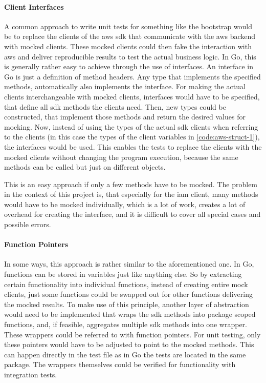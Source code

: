 \paragraph{Client Interfaces} A common approach to write unit tests for something like the bootstrap would be to replace the clients of the \ac{aws} \ac{sdk} that communicate with the \ac{aws} backend with mocked clients.
These mocked clients could then fake the interaction with \ac{aws} and deliver reproducible results to test the actual business logic.
In Go, this is generally rather easy to achieve through the use of interfaces.
An interface in Go is just a definition of method headers.
Any type that implements the specified methods, automatically also implements the interface.
For making the actual clients interchangeable with mocked clients, interfaces would have to be specified, that define all \ac{sdk} methods the clients need.
Then, new types could be constructed, that implement those methods and return the desired values for mocking.
Now, instead of using the types of the actual \ac{sdk} clients when referring to the clients (in this case the types of the client variables in \autoref{code:aws-struct-1}), the interfaces would be used.
This enables the tests to replace the clients with the mocked clients without changing the program execution, because the same methods can be called but just on different objects.

This is an easy approach if only a few methods have to be mocked.
The problem in the context of this project is, that especially for the \ac{iam} client, many methods would have to be mocked individually, which is a lot of work, creates a lot of overhead for creating the interface, and it is difficult to cover all special cases and possible errors.

\paragraph{Function Pointers}
In some ways, this approach is rather similar to the aforementioned one.
In Go, functions can be stored in variables just like anything else.
So by extracting certain functionality into individual functions, instead of creating entire mock clients, just some functions could be swapped out for other functions delivering the mocked results.
To make use of this principle, another layer of abstraction would need to be implemented that wraps the \ac{sdk} methods into package scoped functions, and, if feasible, aggregates multiple \ac{sdk} methods into one wrapper.
These wrappers could be referred to with function pointers.
For unit testing, only these pointers would have to be adjusted to point to the mocked methods.
This can happen directly in the test file as in Go the tests are located in the same package.
The wrappers themselves could be verified for functionality with integration tests.

